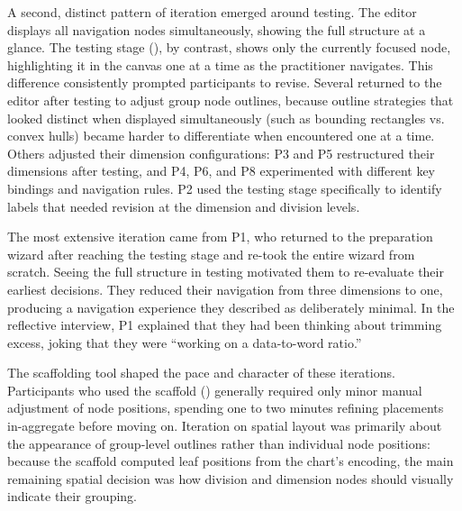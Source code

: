 \documentclass[12pt]{cmuthesis}
\begin{document}
A second, distinct pattern of iteration emerged around testing. The editor displays all navigation nodes simultaneously, showing the full structure at a glance. The testing stage (), by contrast, shows only the currently focused node, highlighting it in the canvas one at a time as the practitioner navigates. This difference consistently prompted participants to revise. Several returned to the editor after testing to adjust group node outlines, because outline strategies that looked distinct when displayed simultaneously (such as bounding rectangles vs. convex hulls) became harder to differentiate when encountered one at a time. Others adjusted their dimension configurations: P3 and P5 restructured their dimensions after testing, and P4, P6, and P8 experimented with different key bindings and navigation rules. P2 used the testing stage specifically to identify labels that needed revision at the dimension and division levels.

The most extensive iteration came from P1, who returned to the preparation wizard after reaching the testing stage and re-took the entire wizard from scratch. Seeing the full structure in testing motivated them to re-evaluate their earliest decisions. They reduced their navigation from three dimensions to one, producing a navigation experience they described as deliberately minimal. In the reflective interview, P1 explained that they had been thinking about trimming excess, joking that they were ``working on a data-to-word ratio.''

The scaffolding tool shaped the pace and character of these iterations. Participants who used the scaffold () generally required only minor manual adjustment of node positions, spending one to two minutes refining placements in-aggregate before moving on. Iteration on spatial layout was primarily about the appearance of group-level outlines rather than individual node positions: because the scaffold computed leaf positions from the chart's encoding, the main remaining spatial decision was how division and dimension nodes should visually indicate their grouping.
\end{document}
